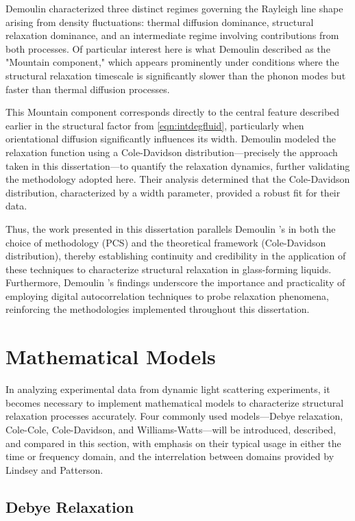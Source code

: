 Demoulin \etal characterized three distinct regimes governing the Rayleigh line shape arising from density fluctuations: thermal diffusion dominance, structural relaxation dominance, and an intermediate regime involving contributions from both processes. Of particular interest here is what Demoulin \etal described as the "Mountain component," which appears prominently under conditions where the structural relaxation timescale is significantly slower than the phonon modes but faster than thermal diffusion processes.

This Mountain component corresponds directly to the central feature described earlier in the structural factor from \eqn\nolinebreak \ref{eqn:intdegfluid}, particularly when orientational diffusion significantly influences its width. Demoulin \etal modeled the relaxation function using a Cole-Davidson distribution—precisely the approach taken in this dissertation—to quantify the relaxation dynamics, further validating the methodology adopted here. Their analysis determined that the Cole-Davidson distribution, characterized by a width parameter, provided a robust fit for their data.

Thus, the work presented in this dissertation parallels Demoulin \etal’s in both the choice of methodology (PCS) and the theoretical framework (Cole-Davidson distribution), thereby establishing continuity and credibility in the application of these techniques to characterize structural relaxation in glass-forming liquids. Furthermore, Demoulin \etal's findings underscore the importance and practicality of employing digital autocorrelation techniques to probe relaxation phenomena, reinforcing the methodologies implemented throughout this dissertation.

\section{Mathematical Models}
\label{sec:models}

In analyzing experimental data from dynamic light scattering experiments, it becomes necessary to implement mathematical models to characterize structural relaxation processes accurately. Four commonly used models—Debye relaxation, Cole-Cole, Cole-Davidson, and Williams-Watts—will be introduced, described, and compared in this section, with emphasis on their typical usage in either the time or frequency domain, and the interrelation between domains provided by Lindsey and Patterson.

\subsection{Debye Relaxation}

